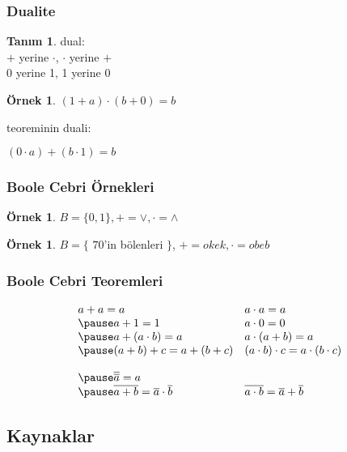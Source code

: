 \documentclass[dvipsnames]{beamer}
\theoremstyle{definition}
\newtheorem{tanim}[theorem]{Tanım}
\theoremstyle{example}
\newtheorem{ornek}[theorem]{Örnek}
\theoremstyle{plain}
\begin{document}
\begin{frame}
  \frametitle{Dualite}

  \begin{tanim}
    \alert{dual}:\\
    $+$ yerine $\cdot$, $\cdot$ yerine $+$\\
    0 yerine 1, 1 yerine 0
  \end{tanim}

  \pause
  \begin{ornek}
    $(1 + a) \cdot (b + 0) = b$

    teoreminin duali:

    $(0 \cdot a) + (b \cdot 1) = b$
  \end{ornek}
\end{frame}

\begin{frame}
  \frametitle{Boole Cebri Örnekleri}

  \begin{ornek}
    $B = \{0,1\}, + = \vee, \cdot = \wedge$
  \end{ornek}

  \pause
  \begin{ornek}
    $B = \{$ $70$'in bölenleri $\}$, $+ = okek, \cdot = obeb$
  \end{ornek}
\end{frame}

\begin{frame}
  \frametitle{Boole Cebri Teoremleri}

    \[\begin{array}{ll}
      a + a = a &
      a \cdot a = a\\ \pause
      a + 1 = 1 &
      a \cdot 0 = 0\\ \pause
      a + (a \cdot b) = a &
      a \cdot (a + b) = a\\ \pause
      (a + b) + c = a + (b + c) &
      (a \cdot b) \cdot c = a \cdot (b \cdot c)\bigskip\\ \pause
      \overline{\overline{a}} = a & \\ \pause
      \overline{a + b} = \overline{a} \cdot \overline{b} &
      \overline{a \cdot b} = \overline{a} + \overline{b}
    \end{array}\]
\end{frame}

\subsection*{Kaynaklar}
\end{document}
